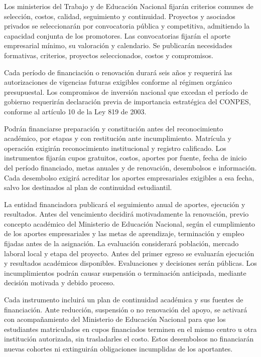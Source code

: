 \begin{mdframed}[linewidth=0.6pt,linecolor=gray!60,backgroundcolor=gray!3,
  innertopmargin=10pt,innerbottommargin=10pt,innerleftmargin=10pt,innerrightmargin=10pt]
Los ministerios del Trabajo y de Educación Nacional fijarán criterios comunes de selección, costos, calidad, seguimiento y continuidad. Proyectos y asociados privados se seleccionarán por convocatoria pública y competitiva, admitiendo la capacidad conjunta de los promotores. Las convocatorias fijarán el aporte empresarial mínimo, su valoración y calendario. Se publicarán necesidades formativas, criterios, proyectos seleccionados, costos y compromisos.

Cada período de financiación o renovación durará seis años y requerirá las autorizaciones de vigencias futuras exigibles conforme al régimen orgánico presupuestal. Los compromisos de inversión nacional que excedan el período de gobierno requerirán declaración previa de importancia estratégica del CONPES, conforme al artículo 10 de la Ley 819 de 2003.

Podrán financiarse preparación y constitución antes del reconocimiento académico, por etapas y con restitución ante incumplimiento. Matrícula y operación exigirán reconocimiento institucional y registro calificado. Los instrumentos fijarán cupos gratuitos, costos, aportes por fuente, fecha de inicio del período financiado, metas anuales y de renovación, desembolsos e información. Cada desembolso exigirá acreditar los aportes empresariales exigibles a esa fecha, salvo los destinados al plan de continuidad estudiantil.

La entidad financiadora publicará el seguimiento anual de aportes, ejecución y resultados. Antes del vencimiento decidirá motivadamente la renovación, previo concepto académico del Ministerio de Educación Nacional, según el cumplimiento de los aportes empresariales y las metas de aprendizaje, terminación y empleo fijadas antes de la asignación. La evaluación considerará población, mercado laboral local y etapa del proyecto. Antes del primer egreso se evaluarán ejecución y resultados académicos disponibles. Evaluaciones y decisiones serán públicas. Los incumplimientos podrán causar suspensión o terminación anticipada, mediante decisión motivada y debido proceso.

Cada instrumento incluirá un plan de continuidad académica y sus fuentes de financiación. Ante reducción, suspensión o no renovación del apoyo, se activará con acompañamiento del Ministerio de Educación Nacional para que los estudiantes matriculados en cupos financiados terminen en el mismo centro u otra institución autorizada, sin trasladarles el costo. Estos desembolsos no financiarán nuevas cohortes ni extinguirán obligaciones incumplidas de los aportantes.


\end{mdframed}
